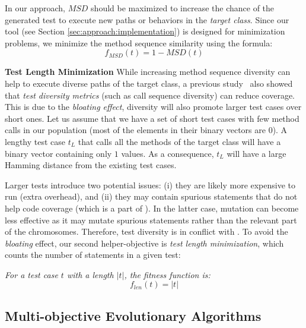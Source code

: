 In our approach, $MSD$ should be maximized to increase the chance of the generated test to execute new paths or behaviors in the \textit{target class}. Since our tool (see Section \ref{sec:approach:implementation}) is designed for minimization problems, we minimize the method sequence similarity using the formula:
\begin{equation}
    f_{MSD}(t) = 1 - MSD(t)
\end{equation}



\textbf{Test Length Minimization}
While increasing method sequence diversity can help to execute diverse paths of the target class, a previous study~\cite{albunian2017diversity} also showed that \textit{test diversity metrics} (such as call sequence diversity) can reduce coverage. This is due to the \textit{bloating effect}, \ie diversity will also promote larger test cases over short ones. Let us assume that we have a set of short test cases with few method calls in our population (most of the elements in their binary vectors are $0$). A lengthy test case $t_L$ that calls all the methods of the target class will have a binary vector containing only $1$ values. As a consequence, $t_L$ will have a large Hamming distance from the existing test cases. 

Larger tests introduce two potential issues: (i) they are likely more expensive to run (extra overhead), and (ii) they may contain spurious statements that do not help code coverage (which is a part of \CrashFunction). In the latter case, mutation can become less effective as it may mutate spurious statements rather than the relevant part of the chromosomes. Therefore, test diversity is in conflict with \CrashFunction. 
To avoid the \textit{bloating} effect, our second helper-objective is \textit{test length minimization}, which counts the number of statements in a given test:

\begin{definition}
\textit{For a test case $t$ with a length $|t|$, the fitness function is:}
\begin{equation}
 f_{len}(t) = |t|
 \end{equation}
\end{definition}



\subsection{Multi-objective Evolutionary Algorithms}

